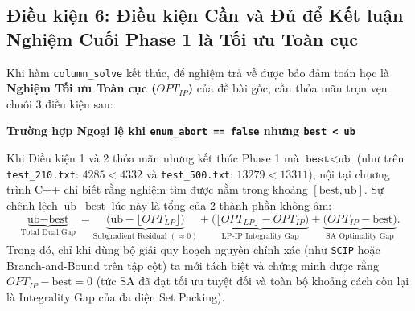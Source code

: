 \documentclass[11pt,a4paper]{article}
\theoremstyle{definition}
\newenvironment{warnbox}[1]{%
    \par\medskip\noindent
    \begin{lrbox}{\calloutbox}%
    \begin{minipage}{\dimexpr\linewidth-2\fboxsep-2\fboxrule\relax}
    \textbf{\textcolor{accentred}{#1}}\par\smallskip
}{%
    \end{minipage}%
    \end{lrbox}%
    \fcolorbox{borderamber}{softamber}{\usebox{\calloutbox}}%
    \par\medskip
}
\begin{document}
\subsection{Điều kiện 6: Điều kiện Cần và Đủ để Kết luận Nghiệm Cuối Phase 1 là Tối ưu Toàn cục}
Khi hàm \texttt{column\_solve} kết thúc, để nghiệm trả về được bảo đảm toán học là \textbf{Nghiệm Tối ưu Toàn cục ($OPT_{IP}$)} của đề bài gốc, cần thỏa mãn trọn vẹn chuỗi 3 điều kiện sau:

\begin{table}[htbp]
\centering
\renewcommand{\arraystretch}{1.35}
\caption{Ba điều kiện cần và đủ để nội tại Phase 1 tự chứng nhận Tối ưu Toàn cục 100\%.}
\end{table}

\begin{warnbox}{Trường hợp Ngoại lệ khi \texttt{enum\_abort == false} nhưng \texttt{best < ub}}
Khi Điều kiện 1 và 2 thỏa mãn nhưng kết thúc Phase 1 mà $\texttt{best} < \texttt{ub}$ (như trên \texttt{test\_210.txt}: $4285 < 4332$ và \texttt{test\_500.txt}: $13279 < 13311$), nội tại chương trình C++ chỉ biết rằng nghiệm tìm được nằm trong khoảng $[\text{best}, \text{ub}]$. Sự chênh lệch $\text{ub} - \text{best}$ lúc này là tổng của 2 thành phần không âm:
\[
    \underbrace{\text{ub} - \text{best}}_{\text{Total Dual Gap}} = \underbrace{\big(\text{ub} - \lfloor OPT_{LP} \rfloor\big)}_{\text{Subgradient Residual } (\approx 0)} + \underbrace{\big(\lfloor OPT_{LP} \rfloor - OPT_{IP}\big)}_{\text{LP-IP Integrality Gap}} + \underbrace{\big(OPT_{IP} - \text{best}\big)}_{\text{SA Optimality Gap}}.
\]
Trong đó, chỉ khi dùng bộ giải quy hoạch nguyên chính xác (như \texttt{SCIP} hoặc Branch-and-Bound trên tập cột) ta mới tách biệt và chứng minh được rằng $OPT_{IP} - \text{best} = 0$ (tức SA đã đạt tối ưu tuyệt đối và toàn bộ khoảng cách còn lại là Integrality Gap của đa diện Set Packing).
\end{warnbox}
\end{document}
